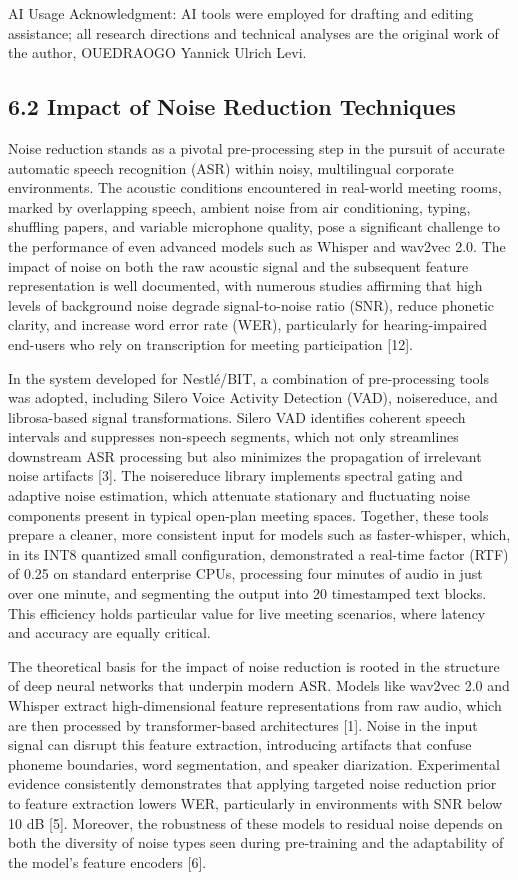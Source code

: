\documentclass[12pt,a4paper]{article}
\begin{document}
AI Usage Acknowledgment: AI tools were employed for drafting and editing assistance; all research directions and technical analyses are the original work of the author, OUEDRAOGO Yannick Ulrich Levi.


\subsection{6.2 Impact of Noise Reduction Techniques}


Noise reduction stands as a pivotal pre-processing step in the pursuit of accurate automatic speech recognition (ASR) within noisy, multilingual corporate environments. The acoustic conditions encountered in real-world meeting rooms, marked by overlapping speech, ambient noise from air conditioning, typing, shuffling papers, and variable microphone quality, pose a significant challenge to the performance of even advanced models such as Whisper and wav2vec 2.0. The impact of noise on both the raw acoustic signal and the subsequent feature representation is well documented, with numerous studies affirming that high levels of background noise degrade signal-to-noise ratio (SNR), reduce phonetic clarity, and increase word error rate (WER), particularly for hearing-impaired end-users who rely on transcription for meeting participation [12].


In the system developed for Nestlé/BIT, a combination of pre-processing tools was adopted, including Silero Voice Activity Detection (VAD), noisereduce, and librosa-based signal transformations. Silero VAD identifies coherent speech intervals and suppresses non-speech segments, which not only streamlines downstream ASR processing but also minimizes the propagation of irrelevant noise artifacts [3]. The noisereduce library implements spectral gating and adaptive noise estimation, which attenuate stationary and fluctuating noise components present in typical open-plan meeting spaces. Together, these tools prepare a cleaner, more consistent input for models such as faster-whisper, which, in its INT8 quantized small configuration, demonstrated a real-time factor (RTF) of 0.25 on standard enterprise CPUs, processing four minutes of audio in just over one minute, and segmenting the output into 20 timestamped text blocks. This efficiency holds particular value for live meeting scenarios, where latency and accuracy are equally critical.


The theoretical basis for the impact of noise reduction is rooted in the structure of deep neural networks that underpin modern ASR. Models like wav2vec 2.0 and Whisper extract high-dimensional feature representations from raw audio, which are then processed by transformer-based architectures [1]. Noise in the input signal can disrupt this feature extraction, introducing artifacts that confuse phoneme boundaries, word segmentation, and speaker diarization. Experimental evidence consistently demonstrates that applying targeted noise reduction prior to feature extraction lowers WER, particularly in environments with SNR below 10 dB [5]. Moreover, the robustness of these models to residual noise depends on both the diversity of noise types seen during pre-training and the adaptability of the model’s feature encoders [6].
\end{document}
